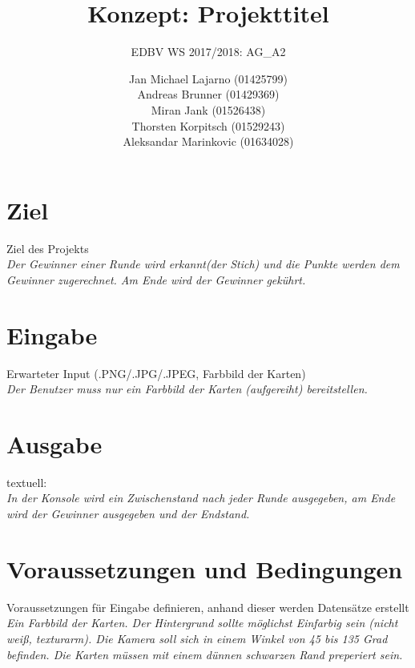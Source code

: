 \documentclass[deutsch]{scrartcl}
\begin{document}
\title{Konzept: Projekttitel} %

\subtitle{EDBV WS 2017/2018: AG\_A2} %


\author{Jan Michael Lajarno (01425799)\\
Andreas Brunner (01429369)\\
Miran Jank (01526438)\\
Thorsten Korpitsch (01529243)\\
Aleksandar Marinkovic (01634028)\\
}




\maketitle



\section{Ziel}
Ziel des Projekts\\
\textit{Der Gewinner einer Runde wird erkannt(der Stich) und die Punkte werden dem Gewinner zugerechnet. Am Ende wird der Gewinner gekührt.}
\section{Eingabe}
Erwarteter Input (.PNG/.JPG/.JPEG, Farbbild der Karten)\\
\textit{Der Benutzer muss nur ein Farbbild der Karten (aufgereiht) bereitstellen.}
\section{Ausgabe}
textuell:\\
\textit{In der Konsole wird ein Zwischenstand nach jeder Runde ausgegeben, am Ende wird der Gewinner ausgegeben und der Endstand.}
\section{Voraussetzungen und Bedingungen}
Voraussetzungen für Eingabe definieren, anhand dieser werden Datensätze erstellt\\
\textit{Ein Farbbild der Karten. Der Hintergrund sollte möglichst Einfarbig sein (nicht weiß, texturarm). Die Kamera soll sich in einem Winkel von 45 bis 135 Grad befinden. Die Karten müssen mit einem dünnen schwarzen Rand preperiert sein.}
\end{document}
